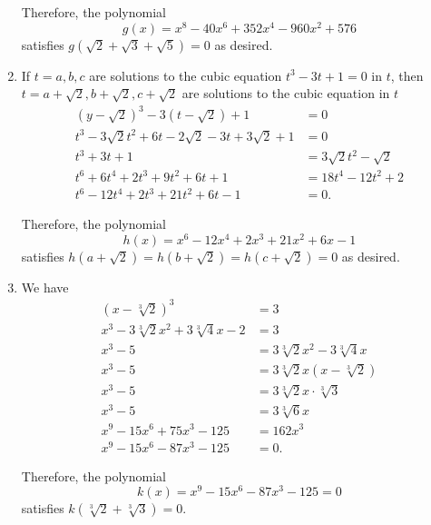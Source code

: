 \begin{enumerate}
          Therefore, the polynomial
          \[
              g(x) = x^8 - 40 x^6 + 352 x^4 - 960 x^2 + 576
          \]
          satisfies \(g\left(\sqrt{2} + \sqrt{3} + \sqrt{5}\right) = 0\) as desired.

    \item If \(t = a, b, c\) are solutions to the cubic equation \(t^3 - 3t + 1 = 0\) in \(t\), then \(t = a + \sqrt{2}, b + \sqrt{2}, c + \sqrt{2}\) are solutions to the cubic equation in \(t\)
          \begin{align*}
              \left(y - \sqrt{2}\right)^3 - 3 \left(t - \sqrt{2}\right) + 1 & = 0                         \\
              t^3 - 3 \sqrt{2} t^2 + 6t - 2 \sqrt{2} - 3t + 3 \sqrt{2} + 1  & = 0                         \\
              t^3 + 3t + 1                                                  & = 3 \sqrt{2} t^2 - \sqrt{2} \\
              t^6 + 6 t^4 + 2t^3 + 9t^2 + 6t + 1                            & = 18 t^4 - 12 t^2 + 2       \\
              t^6 - 12 t^4 + 2t^3 + 21 t^2 + 6t - 1                         & = 0.
          \end{align*}

          Therefore, the polynomial
          \[
              h(x) = x^6 - 12 x^4 + 2 x^3 + 21 x^2 + 6x - 1
          \]
          satisfies \(h \left(a + \sqrt{2}\right) = h \left(b + \sqrt{2}\right) = h \left(c + \sqrt{2}\right) = 0\) as desired.

    \item We have
          \begin{align*}
              \left(x - \sqrt[3]{2}\right)^3                & = 3                                            \\
              x^3 - 3 \sqrt[3]{2} x^2 + 3 \sqrt[3]{4} x - 2 & = 3                                            \\
              x^3 - 5                                       & = 3 \sqrt[3]{2} x^2 - 3 \sqrt[3]{4} x          \\
              x^3 - 5                                       & = 3 \sqrt[3]{2} x \left(x - \sqrt[3]{2}\right) \\
              x^3 - 5                                       & = 3 \sqrt[3]{2} x \cdot \sqrt[3]{3}            \\
              x^3 - 5                                       & = 3 \sqrt[3]{6} x                              \\
              x^9 - 15 x^6 + 75 x^3 - 125                   & = 162 x^3                                      \\
              x^9 - 15 x^6 - 87 x^3 - 125                   & = 0.
          \end{align*}

          Therefore, the polynomial
          \[
              k(x) = x^9 - 15 x^6 - 87 x^3 - 125 = 0
          \]
          satisfies \(k \left(\sqrt[3]{2} + \sqrt[3]{3}\right) = 0\).
\end{enumerate}